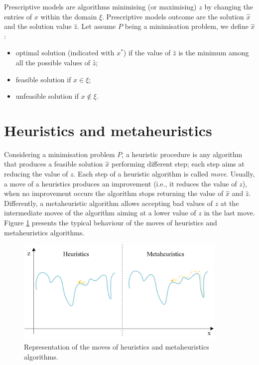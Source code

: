 Prescriptive models are algorithms minimising (or maximising) $z$ by changing the entries of $x$ within the domain $\xi$. Prescriptive models outcome are the solution $\hat{x}$ and the solution value $\hat{z}$. Let assume $P$ being a minimisation problem, we define $\hat{x}$:

\begin{itemize}
    \item optimal solution (indicated with $x^\ast$) if the value of $\hat{z}$ is the minimum among all the possible values of $\hat{z}$;
    \item feasible solution if $x\in\xi$;
    \item unfeasible solution if $x\notin\xi$.
\end{itemize}

\section{Heuristics and metaheuristics}
Considering a minimisation problem $P$, a heuristic procedure is any algorithm that produces a feasible solution $\hat{x}$ performing different step; each step aims at reducing the value of $z$. Each step of a heuristic algorithm is called \textit{move}. Usually, a move of a heuristics produces an improvement (i.e., it reduces the value of $z$), when no improvement occurs the algorithm stops returning the value of $\hat{x}$ and $\hat{z}$. Differently, a metaheuristic algorithm allows accepting bad values of $z$ at the intermediate moves of the algorithm aiming at a lower value of $z$ in the last move. Figure \ref{fig_heurMetaheur} presents the typical behaviour of the moves of heuristics and metaheuristics algorithms.


\begin{figure}[hbt!]
\centering
\includegraphics[width=0.9\textwidth]{SectionLetsMath/prescriptive_fig/fig_heurMetaheur.png}
\captionsetup{type=figure}
\caption{Representation of the moves of heuristics and metaheuristics algorithms.}
\label{fig_heurMetaheur}
\end{figure}

